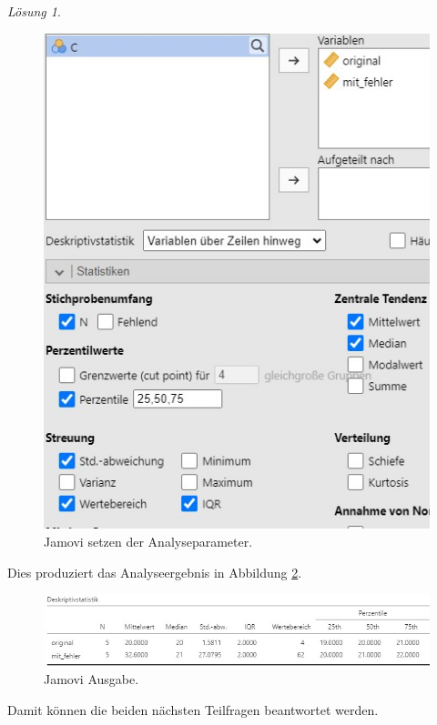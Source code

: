 \documentclass[
]{book}
\theoremstyle{definition}
\theoremstyle{definition}
\theoremstyle{definition}
\theoremstyle{definition}
\theoremstyle{remark}
\newtheorem*{solution}{Lösung}
\begin{document}
\begin{solution}
\begin{figure}
\includegraphics[width=1\linewidth]{figures/02-exr-theorie-variabilitaet-jmv-input} \caption{Jamovi setzen der Analyseparameter.}\label{fig:sol-theorie-variabilitaet-input}
\end{figure}

Dies produziert das Analyseergebnis in Abbildung \ref{fig:sol-theorie-variabilitaet-output}.

\begin{figure}
\includegraphics[width=1\linewidth]{figures/02-exr-theorie-variabilitaet-jmv-output} \caption{Jamovi Ausgabe.}\label{fig:sol-theorie-variabilitaet-output}
\end{figure}

Damit können die beiden nächsten Teilfragen beantwortet werden.


\end{solution}
\end{document}
